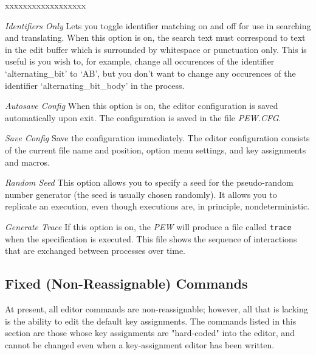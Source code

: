 \begin{describe}{xxxxxxxxxxxxxxxxxx}
\item[\em Identifiers Only]Lets you toggle identifier matching on and off
for use in searching and translating. When this option is on, the
search text must correspond to text in the edit buffer which is
surrounded by whitespace or punctuation only. This is useful is you
wish to, for example, change all occurences of the identifier
`alternating\_bit' to `AB', but you don't want to change any
occurences of the identifier `alternating\_bit\_body' in the process.
\item[\em Autosave Config]When this option is on, the editor
configuration is saved automatically upon exit. The configuration is
saved in the file {\em PEW.CFG}.
\item[\em Save Config]Save the configuration immediately. The editor
configuration consists of the current file name and position,
option menu settings, and key assignments and macros.
\item[\em Random Seed]This option allows you to specify a seed for
the pseudo-random number generator (the seed is usually chosen
randomly).  It allows you to replicate an execution, even though
executions are, in principle, nondeterministic.
\item[\em Generate Trace]If this option is on, the {\em PEW} will
produce a file called {\tt trace} when the specification is executed.
This file shows the sequence of interactions that are exchanged
between processes over time.
\end{describe}

\subsection[Fixed (Non-Reassignable) Commands]{Fixed (Non-Reassignable)
Commands}

At present, all editor commands are non-reassignable; however,
all that is lacking is the ability to edit the default key
assignments. The commands listed in this section are those whose
key assignments are "hard-coded" into the editor, and cannot be
changed even when a key-assignment editor has been written.

